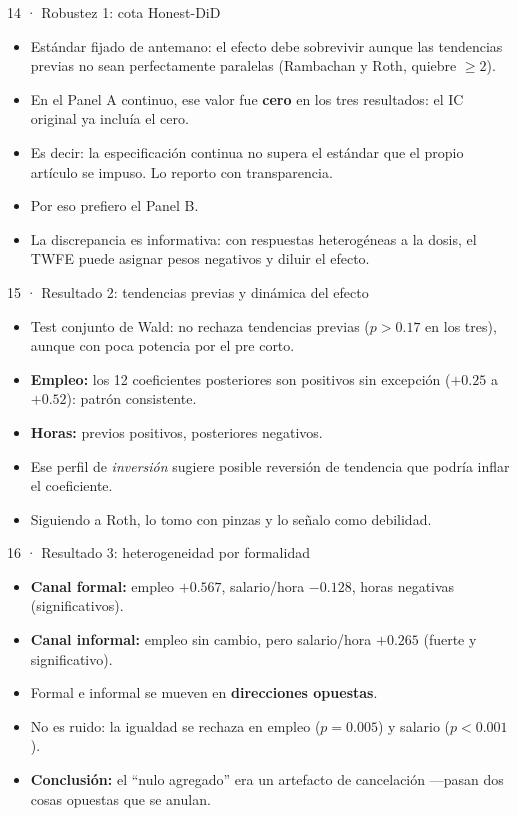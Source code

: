 \documentclass[11pt,aspectratio=169]{beamer}
\begin{document}
\begin{frame}{14 · Robustez 1: cota Honest-DiD}
\begin{itemize}
  \item Estándar fijado de antemano: el efecto debe sobrevivir aunque las tendencias previas no sean perfectamente paralelas (Rambachan y Roth, quiebre $\geq 2$).
  \item En el Panel A continuo, ese valor fue \textbf{cero} en los tres resultados: el IC original ya incluía el cero.
  \item Es decir: la especificación continua no supera el estándar que el propio artículo se impuso. Lo reporto con transparencia.
  \item Por eso prefiero el Panel B.
  \item La discrepancia es informativa: con respuestas heterogéneas a la dosis, el TWFE puede asignar pesos negativos y diluir el efecto.
\end{itemize}
\end{frame}

\begin{frame}{15 · Resultado 2: tendencias previas y dinámica del efecto}
\begin{itemize}
  \item Test conjunto de Wald: no rechaza tendencias previas ($p>0.17$ en los tres), aunque con poca potencia por el pre corto.
  \item \textbf{Empleo:} los 12 coeficientes posteriores son positivos sin excepción ($+0.25$ a $+0.52$): patrón consistente.
  \item \textbf{Horas:} previos positivos, posteriores negativos.
  \item Ese perfil de \emph{inversión} sugiere posible reversión de tendencia que podría inflar el coeficiente.
  \item Siguiendo a Roth, lo tomo con pinzas y lo señalo como debilidad.
\end{itemize}
\end{frame}

\begin{frame}{16 · Resultado 3: heterogeneidad por formalidad}
\begin{itemize}
  \item \textbf{Canal formal:} empleo $+0.567$, salario/hora $-0.128$, horas negativas (significativos).
  \item \textbf{Canal informal:} empleo sin cambio, pero salario/hora $+0.265$ (fuerte y significativo).
  \item Formal e informal se mueven en \textbf{direcciones opuestas}.
  \item No es ruido: la igualdad se rechaza en empleo ($p=0.005$) y salario ($p<0.001$).
  \item \textbf{Conclusión:} el ``nulo agregado'' era un artefacto de cancelación —pasan dos cosas opuestas que se anulan.
\end{itemize}
\end{frame}
\end{document}
